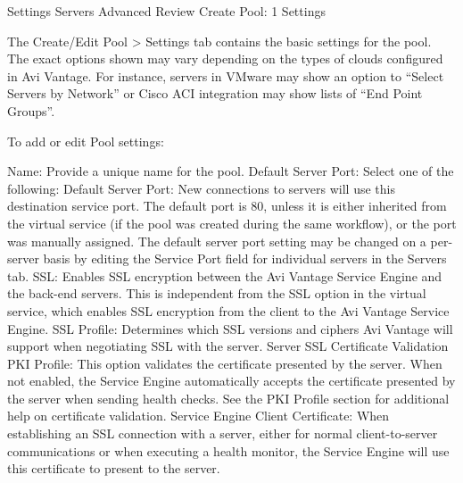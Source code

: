 \documentclass[letterpaper,10pt,english]{sphinxmanual}
\begin{document}
Settings
Servers
Advanced
Review
Create Pool: 1 Settings

The Create/Edit Pool \textgreater{} Settings tab contains the basic settings for the pool. The exact options shown may vary depending on the types of clouds configured in Avi Vantage. For instance, servers in VMware may show an option to ``Select Servers by Network'' or Cisco ACI integration may show lists of ``End Point Groups''.

To add or edit Pool settings:

Name: Provide a unique name for the pool.
Default Server Port: Select one of the following:
Default Server Port: New connections to servers will use this destination service port. The default port is 80, unless it is either inherited from the virtual service (if the pool was created during the same workflow), or the port was manually assigned. The default server port setting may be changed on a per-server basis by editing the Service Port field for individual servers in the Servers tab.
SSL: Enables SSL encryption between the Avi Vantage Service Engine and the back-end servers. This is independent from the SSL option in the virtual service, which enables SSL encryption from the client to the Avi Vantage Service Engine.
SSL Profile: Determines which SSL versions and ciphers Avi Vantage will support when negotiating SSL with the server.
Server SSL Certificate Validation PKI Profile: This option validates the certificate presented by the server. When not enabled, the Service Engine automatically accepts the certificate presented by the server when sending health checks. See the PKI Profile section for additional help on certificate validation.
Service Engine Client Certificate: When establishing an SSL connection with a server, either for normal client-to-server communications or when executing a health monitor, the Service Engine will use this certificate to present to the server.
\end{document}
